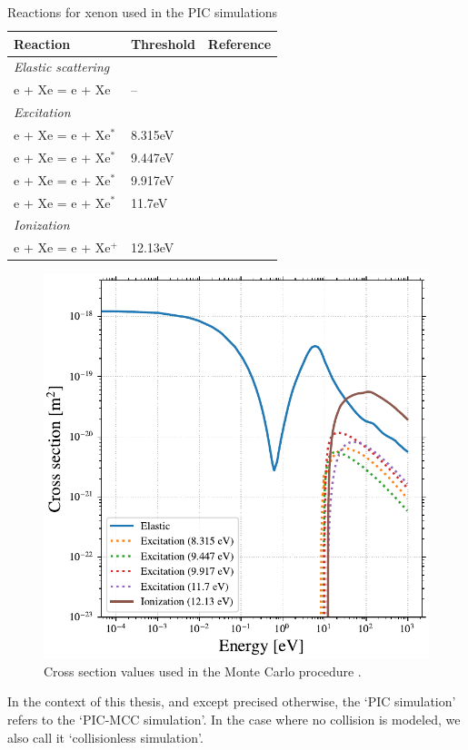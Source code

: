     \begin{table}[hbt]
      \centering
      \caption{Reactions for xenon used in the PIC simulations}
      \label{tab-reactXe}
      \begin{tabular}{@{}lll@{}}  \toprule
        Reaction & Threshold & Reference\\ \midrule
        {\it Elastic scattering} & &\\
        e + Xe = e + Xe   & --   & \cite{Lxcat_Xe,Lxcat_Xe2} \\
        {\it Excitation} & &\\
        e + Xe = e + Xe$^*$   & 8.315eV   & \cite{Lxcat_Xe,Lxcat_Xe2} \\
        e + Xe = e + Xe$^*$   & 9.447eV   & \cite{Lxcat_Xe,Lxcat_Xe2} \\
        e + Xe = e + Xe$^*$   & 9.917eV   & \cite{Lxcat_Xe,Lxcat_Xe2} \\
        e + Xe = e + Xe$^*$   & 11.7eV    & \cite{Lxcat_Xe,Lxcat_Xe2} \\
        {\it Ionization} & &\\
        e + Xe = e + Xe$^+$   & 12.13eV   & \cite{Lxcat_Xe,Lxcat_Xe2} \\
        \bottomrule
      \end{tabular}
    \end{table}



    \begin{figure}[hbt]
      \centering
      \includegraphics[width=\defaultwidth]{figure/xenon_cross_section.pdf}
      \caption{Cross section values used in the Monte Carlo procedure \cite{Lxcat_Xe,Lxcat_Xe2}.}
      \label{fig-xexsection}
    \end{figure}

    In the context of this thesis, and except precised otherwise, the `\ac{PIC} simulation' refers to the `\ac{PIC}-\ac{MCC} simulation'.
    In the case where no collision is modeled, we also call it `collisionless simulation'.
